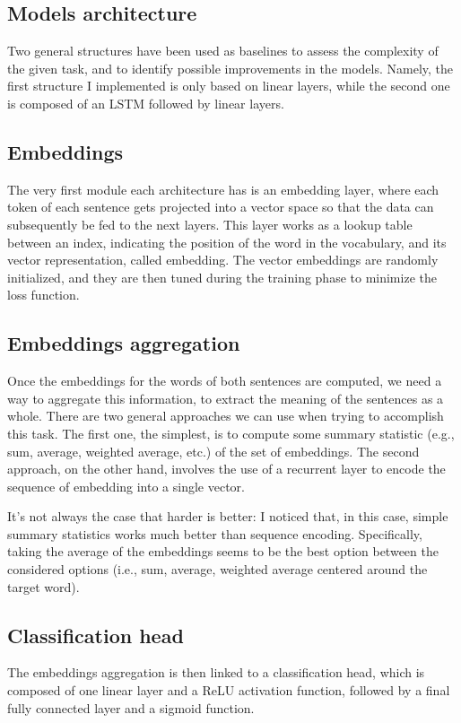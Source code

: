 \documentclass[11pt,a4paper]{article}
\begin{document}
	\subsection{Models architecture}
	Two general structures have been used as baselines to assess the complexity of the given task, and to identify possible improvements in the models. Namely, the first structure I implemented is only based on linear layers, while the second one is composed of an LSTM followed by linear layers.
	
	
	\subsection{Embeddings}
	The very first module each architecture has is an embedding layer, where each token of each sentence gets projected into a vector space so that the data can subsequently be fed to the next layers. This layer works as a lookup table between an index, indicating the position of the word in the vocabulary, and its vector representation, called embedding. The vector embeddings are randomly initialized, and they are then tuned during the training phase to minimize the loss function.
	
	\subsection{Embeddings aggregation}
	Once the embeddings for the words of both sentences are computed, we need a way to aggregate this information, to extract the meaning of the sentences as a whole. There are two general approaches we can use when trying to accomplish this task. The first one, the simplest, is to compute some summary statistic (e.g., sum, average, weighted average, etc.) of the set of embeddings. The second approach, on the other hand, involves the use of a recurrent layer to encode the sequence of embedding into a single vector.
	
	It's not always the case that harder is better: I noticed that, in this case, simple summary statistics works much better than sequence encoding. Specifically, taking the average of the embeddings seems to be the best option between the considered options (i.e., sum, average, weighted average centered around the target word).
	
	\subsection{Classification head}
	The embeddings aggregation is then linked to a classification head, which is composed of one linear layer and a ReLU activation function, followed by a final fully connected layer and a sigmoid function.
\end{document}
